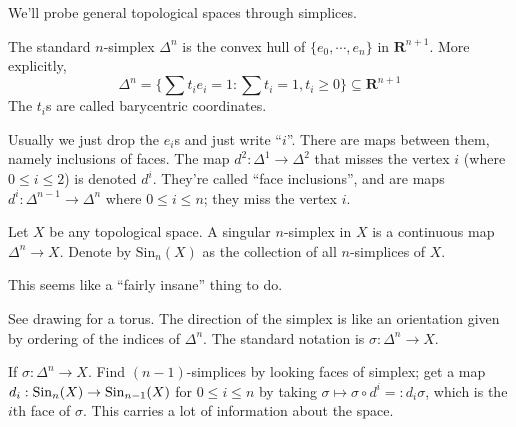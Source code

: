 We'll probe general topological spaces through simplices.
\begin{definition}
The standard $n$-simplex $\Delta^n$ is the convex hull of $\{e_0,\cdots,e_n\}$ in $\mathbf{R}^{n+1}$. More explicitly,
$$\Delta^n = \{\sum t_i e_i = 1 : \sum t_i = 1, t_i\geq 0\}\subseteq\mathbf{R}^{n+1}$$
The $t_i$s are called barycentric coordinates.
\end{definition}
Usually we just drop the $e_i$s and just write ``$i$''. There are maps between them, namely inclusions of faces. The map $d^2:\Delta^1\to\Delta^2$ that misses the vertex $i$ (where $0\leq i\leq 2$) is denoted $d^i$. They're called ``face inclusions'', and are maps $d^i:\Delta^{n-1}\to\Delta^n$ where $0\leq i\leq n$; they miss the vertex $i$.
\begin{definition}
Let $X$ be any topological space. A singular $n$-simplex in $X$ is a continuous map $\Delta^n\to X$. Denote by $\mathrm{Sin}_n(X)$ as the collection of all $n$-simplices of $X$.
    
    This seems like a ``fairly insane'' thing to do.
\end{definition}
See drawing for a torus. The direction of the simplex is like an orientation given by ordering of the indices of $\Delta^n$. The standard notation is $\sigma:\Delta^n\to X$.

If $\sigma:\Delta^n\to X$. Find $(n-1)$-simplices by looking faces of simplex; get a map $d_i:\mathrm{Sin}_n(X)\to\mathrm{Sin}_{n-1}(X)$ for $0\leq i\leq n$ by taking $\sigma\mapsto\sigma\circ d^i=: d_i\sigma$, which is the $i$th face of $\sigma$. This carries a lot of information about the space.

